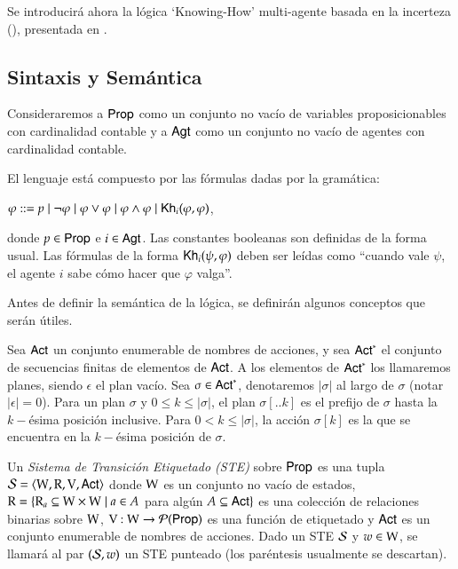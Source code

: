 Se introducirá ahora la lógica `Knowing-How' multi-agente basada en la incerteza (\KHilogic), presentada en \cite{ArecesFSV25}.

\subsection[short]{Sintaxis y Semántica}
Consideraremos a ${\rm \sf Prop}$ como un conjunto no vacío de variables proposicionables con cardinalidad contable 
y a ${\rm \sf Agt}$ como un conjunto no vacío de agentes con cardinalidad contable. 

\begin{definicion}
    El lenguaje \KHilogic está compuesto por las fórmulas dadas por la gramática:
    \begin{center}
        $\varphi ::= p \mid \neg \varphi \mid \varphi \vee \varphi \mid \varphi \wedge \varphi \mid \mathsf{Kh}_i(\varphi,\varphi)$,
    \end{center}
    donde $p \in {\rm \sf Prop}$ e $i \in {\rm \sf Agt}$. Las constantes booleanas son definidas de la forma usual. Las fórmulas de la forma 
    $\mathsf{Kh}_i(\psi, \varphi)$ deben ser leídas como ``cuando vale $\psi$, el agente $i$ sabe cómo hacer que $\varphi$ valga''.
\end{definicion}

Antes de definir la semántica de la lógica, se definirán algunos conceptos que serán útiles.

\begin{definicion}
    Sea ${\rm \sf Act}$ un conjunto enumerable de nombres de acciones, y sea ${\rm \sf Act}^*$ el conjunto de secuencias finitas de elementos de ${\rm \sf Act}$. 
    A los elementos de ${\rm \sf Act}^*$ los llamaremos planes, siendo $\epsilon$ el plan vacío. Sea $\sigma \in {\rm \sf Act}^*$, denotaremos $|\sigma|$ 
    al largo de $\sigma$ (notar $|\epsilon| = 0$). Para un plan $\sigma$ y $0 \leq k \leq |\sigma|$, el plan $\sigma[..k]$ es el prefijo 
    de $\sigma$ hasta la $k-$ésima posición inclusive. Para $0 < k \leq |\sigma|$, la acción $\sigma[k]$ es la que se encuentra en la 
    $k-$ésima posición de $\sigma$.  
\end{definicion}

\begin{definicion}
    Un \emph{Sistema de Transición Etiquetado (STE)} sobre ${\rm \sf Prop}$ es una tupla $\mathcal{S} = \langle \mathrm{W}, \mathrm{R}, \mathrm{V}, {\rm \sf Act} \rangle$ donde $\mathrm{W}$ es un conjunto no 
    vacío de estados, $\mathrm{R} = \{\mathrm{R}_a \subseteq \mathrm{W} \times \mathrm{W} \mid a \in A$ para algún $A \subseteq {\rm \sf Act}\}$ es una colección de relaciones binarias
    sobre $\mathrm{W}$, $\mathrm{V} : \mathrm{W} \to \mathcal{P}({\rm \sf Prop})$ es una función de etiquetado y ${\rm \sf Act}$ es un conjunto enumerable de nombres de acciones.
    Dado un STE $\mathcal{S}$ y $w \in \mathrm{W}$, se llamará al par $(\mathcal{S},w)$ un STE punteado (los paréntesis usualmente se descartan).
\end{definicion}

